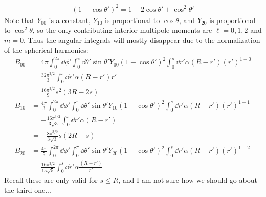 \documentclass[12pt]{article}
\begin{document}
\begin{align*}
  (1-\cos\theta')^2=1-2\cos\theta'+\cos^2\theta'
\end{align*}
Note that $Y_{00}$ is a constant, $Y_{10}$ is proportional to $\cos\theta$, and $Y_{20}$ is proportional to $\cos^2\theta$, so the only contributing interior multipole moments are $\ell=0,1,2$ and $m=0$. Thus the angular integrals will mostly disappear due to the normalization of the spherical harmonics:
\begin{align*}
  B_{00}&=4\pi\int_0^{2\pi}\dd{\phi'}\int_0^\pi\dd{\theta'}\sin\theta'
  Y_{00}(1-\cos\theta')^2
  \int_0^s\dd{r'}\alpha(R-r')(r')^{1-0}\\
  &=\frac{32\pi^{3/2}}3\int_0^s\dd{r'}\alpha(R-r')r'\\
  &=\frac{16\pi^{3/2}}9s^2(3R-2s)\\
  B_{10}&=\frac{4\pi}3\int_0^{2\pi}\dd{\phi'}\int_0^\pi\dd{\theta'}\sin\theta'
  Y_{10}(1-\cos\theta')^2
  \int_0^s\dd{r'}\alpha(R-r')(r')^{1-1}\\
  &=-\frac{16\pi^{3/2}}{3\sqrt{3}}\int_0^s\dd{r'}\alpha(R-r')\\
  &=-\frac{8\pi^{3/2}}{3\sqrt{3}}s(2R-s)\\
  B_{20}&=\frac{4\pi}5\int_0^{2\pi}\dd{\phi'}\int_0^\pi\dd{\theta'}\sin\theta'
  Y_{20}(1-\cos\theta')^2
  \int_0^s\dd{r'}\alpha(R-r')(r')^{1-2}\\
  &=\frac{16\pi^{3/2}}{15\sqrt{5}}\int_0^s\dd{r'}\alpha\frac{(R-r')}{r'}
\end{align*}
Recall these are only valid for $s\leq R$, and I am not sure how we should go about the third one...
\end{document}
